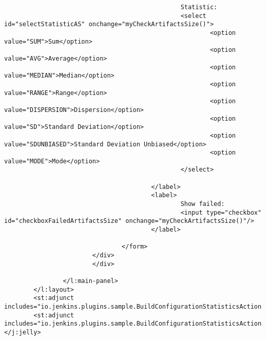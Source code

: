 \begin{lstlisting}
                                                Statistic:
                                                <select id="selectStatisticAS" onchange="myCheckArtifactsSize()">
                                                        <option value="SUM">Sum</option>
                                                        <option value="AVG">Average</option>
                                                        <option value="MEDIAN">Median</option>
                                                        <option value="RANGE">Range</option>
                                                        <option value="DISPERSION">Dispersion</option>
                                                        <option value="SD">Standard Deviation</option>
                                                        <option value="SDUNBIASED">Standard Deviation Unbiased</option>
                                                        <option value="MODE">Mode</option>
                                                </select>

                                        </label>
                                        <label>
                                                Show failed:
                                                <input type="checkbox" id="checkboxFailedArtifactsSize" onchange="myCheckArtifactsSize()"/>
                                        </label>

                                </form>
                        </div>
                        </div>

                </l:main-panel>
        </l:layout>
        <st:adjunct includes="io.jenkins.plugins.sample.BuildConfigurationStatisticsAction.declareChartJsClickArray"/>
        <st:adjunct includes="io.jenkins.plugins.sample.BuildConfigurationStatisticsAction.chartLogicBox"/>
</j:jelly>


\end{lstlisting}

